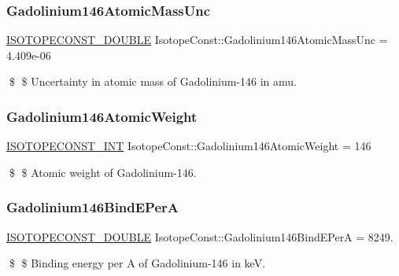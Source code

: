\subsubsection{\texorpdfstring{Gadolinium146\+Atomic\+Mass\+Unc}{Gadolinium146AtomicMassUnc}}
{\footnotesize\ttfamily \mbox{\hyperlink{group___isotope_const-_macros_ga8f45a7272ce02c0b4c65c44636ed719a}{I\+S\+O\+T\+O\+P\+E\+C\+O\+N\+S\+T\+\_\+\+D\+O\+U\+B\+LE}} Isotope\+Const\+::\+Gadolinium146\+Atomic\+Mass\+Unc = 4.\+409e-\/06}

\$ \$ Uncertainty in atomic mass of Gadolinium-\/146 in amu. \mbox{\label{group___isotope_const-_gadolinium-_gd146_ga2dd5f30d9568a7edc7ad712f345594a7}} 
\subsubsection{\texorpdfstring{Gadolinium146\+Atomic\+Weight}{Gadolinium146AtomicWeight}}
{\footnotesize\ttfamily \mbox{\hyperlink{group___isotope_const-_macros_ga5f18360b3e99483a35c32d789e62621c}{I\+S\+O\+T\+O\+P\+E\+C\+O\+N\+S\+T\+\_\+\+I\+NT}} Isotope\+Const\+::\+Gadolinium146\+Atomic\+Weight = 146}

\$ \$ Atomic weight of Gadolinium-\/146. \mbox{\label{group___isotope_const-_gadolinium-_gd146_gaa47f9168468053b71ddb8d7d7d9c6152}} 
\subsubsection{\texorpdfstring{Gadolinium146\+Bind\+E\+PerA}{Gadolinium146BindEPerA}}
{\footnotesize\ttfamily \mbox{\hyperlink{group___isotope_const-_macros_ga8f45a7272ce02c0b4c65c44636ed719a}{I\+S\+O\+T\+O\+P\+E\+C\+O\+N\+S\+T\+\_\+\+D\+O\+U\+B\+LE}} Isotope\+Const\+::\+Gadolinium146\+Bind\+E\+PerA = 8249.}

\$ \$ Binding energy per A of Gadolinium-\/146 in keV. \mbox{\label{group___isotope_const-_gadolinium-_gd146_gaa60eda27057a0e035ceeafdbc5e470c9}} 
